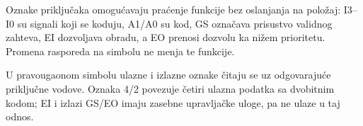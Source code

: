 
Oznake priključaka omogućavaju praćenje funkcije bez oslanjanja na položaj: I3--I0 su signali koji se koduju, A1/A0 su kod, GS označava prisustvo validnog zahteva, EI dozvoljava obradu, a EO prenosi dozvolu ka nižem prioritetu. Promena rasporeda na simbolu ne menja te funkcije.

U pravougaonom simbolu ulazne i izlazne oznake čitaju se uz odgovarajuće priključne vodove. Oznaka 4/2 povezuje četiri ulazna podatka sa dvobitnim kodom; EI i izlazi GS/EO imaju zasebne upravljačke uloge, pa ne ulaze u taj odnos.
